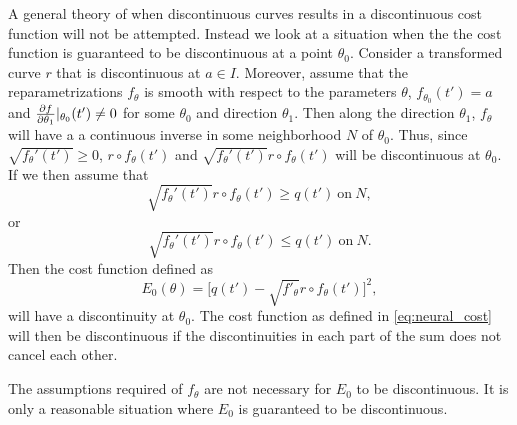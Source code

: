 A general theory of when discontinuous curves results in a discontinuous cost function will not be attempted. Instead we look at a situation when the the cost function is guaranteed to be discontinuous at a point \(\theta_0\). Consider a transformed curve  \(r\) that is discontinuous at  \(a \in I\). Moreover, assume that the reparametrizations  \(f_{\theta}\) is smooth with respect to the parameters  \(\theta\), \(f_{\theta_0}(t')=a\) and  \(\pdv{f}{\theta_1}|_{\theta_0}(t')\neq 0\) for some  \(\theta_0\) and direction \(\theta_1\). Then along the direction  \(\theta_1\),  \(f_{\theta}\) will have a a continuous inverse in some neighborhood  \(N\) of  \(\theta_0\). Thus, since \(\sqrt{f_{\theta}'(t')} \geq 0\), \(r \circ f_\theta(t')\) and  \(\sqrt{f_{\theta}'(t')} r \circ f_\theta(t')\) will be discontinuous at \(\theta_0\). If we then assume that
\begin{equation*}
  \sqrt{f_{\theta}'(t')} r \circ f_\theta(t') \geq  q(t')\ \text{on} \ N,
\end{equation*}
or
\begin{equation*}
  \sqrt{f_{\theta}'(t')} r \circ f_\theta(t') \leq q(t') \ \text{on} \ N.
\end{equation*}
Then the cost function defined as
\begin{equation*}
  E_0(\theta) = \big[q(t') - \sqrt{f'_{\theta}} r \circ f_{\theta}(t')\big]^2,
\end{equation*}
will have a discontinuity at  \(\theta_0\). The cost function as defined in \eqref{eq:neural_cost} will then be discontinuous if the discontinuities in each part of the sum does not cancel each other.

The assumptions required of  \(f_{\theta}\) are not necessary for \(E_0\) to be discontinuous. It is only a reasonable situation where \(E_0\) is guaranteed to be discontinuous.


